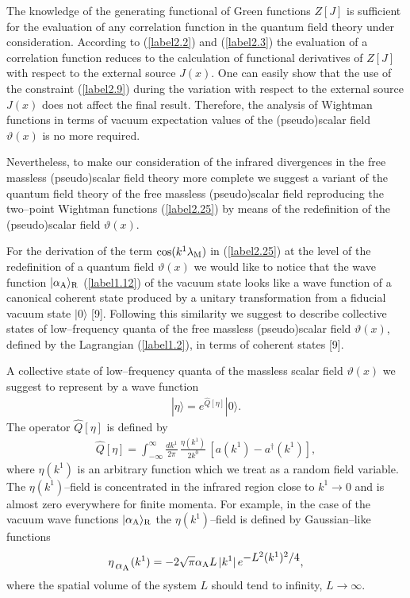 \documentclass[a4paper,12pt] {article}
\begin{document}
\hspace{0.2in} The knowledge of the generating functional of Green
functions $Z[J]$ is sufficient for the evaluation of any correlation
function in the quantum field theory under consideration. According to
(\ref{label2.2}) and (\ref{label2.3}) the evaluation of a correlation
function reduces to the calculation of functional derivatives of
$Z[J]$ with respect to the external source $J(x)$. One can easily show
that the use of the constraint (\ref{label2.9}) during the variation
with respect to the external source $J(x)$ does not affect the final
result. Therefore, the analysis of Wightman functions in terms of
vacuum expectation values of the (pseudo)scalar field $\vartheta(x)$
is no more required.

Nevertheless, to make our consideration of the infrared divergences in
the free massless (pseudo)scalar field theory more complete we suggest
a variant of the quantum field theory of the free massless
(pseudo)scalar field reproducing the two--point Wightman functions
(\ref{label2.25}) by means of the redefinition of the (pseudo)scalar
field $\vartheta(x)$.

For the derivation of the term $\cos(k^1\lambda_{\rm M})$ in
(\ref{label2.25}) at the level of the redefinition of a quantum field
$\vartheta(x)$ we would like to notice that the wave function
$|\alpha_{\rm A}\rangle_{\rm R}$ (\ref{label1.12}) of the vacuum state
looks like a wave function of a canonical coherent state produced by a
unitary transformation from a fiducial vacuum state $|0\rangle$
[9]. Following this similarity we suggest to describe collective
states of low--frequency quanta of the free massless (pseudo)scalar
field $\vartheta(x)$, defined by the Lagrangian (\ref{label1.2}), in
terms of coherent states [9].

A collective state of low--frequency quanta of the massless scalar field
$\vartheta(x)$ we suggest to represent by a wave function
%
\begin{eqnarray}\label{label3.1}
|\eta\rangle = e^{\textstyle \hat{Q}[\eta]}|0\rangle.
\end{eqnarray}
%
The operator $\hat{Q}[\eta]$ is defined by
%
\begin{eqnarray}\label{label3.2}
\hat{Q}[\eta]= \int^{\infty}_{-\infty}\frac{dk^1}{2\pi}\,
 \frac{\eta(k^1)}{2k^0}\,[a(k^1) - a^{\dagger}(k^1)],
\end{eqnarray}
%
where $\eta(k^1)$ is an arbitrary function which we treat as a random
field variable. The $\eta(k^1)$--field is concentrated in the infrared
region close to $k^1 \to 0$ and is almost zero everywhere for finite
momenta. For example, in the case of the vacuum wave functions
$|\alpha_{\rm A}\rangle_{\rm R}$ the $\eta(k^1)$--field is defined by
Gaussian--like functions
%
\begin{eqnarray}\label{label3.3}
\eta_{\textstyle \,_{\textstyle \alpha_{\rm A}}}(k^1) =
-2\sqrt{\pi}\alpha_{\rm A}L\,|k^1|\, e^{\textstyle -L^2(k^1)^2/4},
\end{eqnarray}
%
where the spatial volume of the system $L$ should tend to infinity,
$L\to \infty$.
\end{document}
